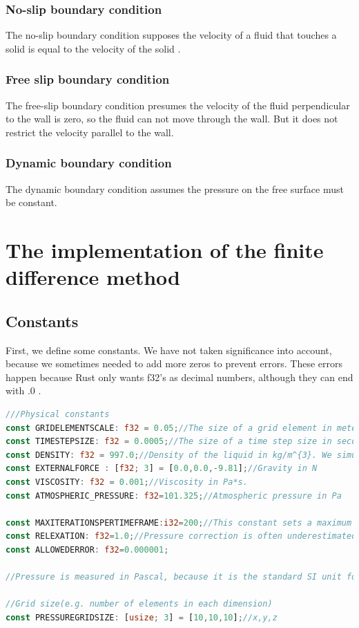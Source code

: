 \documentclass{article}
\begin{document}
\subsubsection{No-slip boundary condition} \label{no-slip boundary condition}
The no-slip boundary condition supposes the velocity of a fluid that touches a solid is equal to the velocity of the solid \cite{no-slip boundary condition}.
\subsubsection{Free slip boundary condition}
The free-slip boundary condition presumes the velocity of the fluid perpendicular to the wall is zero, so the fluid can not move through the wall. But it does not restrict the velocity parallel to the wall.\cite{free slip boundary condition} 
\subsubsection{Dynamic boundary condition}
The dynamic boundary condition assumes the pressure on the free surface must be constant.
\newpage
\section{The implementation of the finite difference method} \label{The implementation of the finite difference method}
\subsection{Constants} \label{Constants}
First, we define some constants. We have not taken significance into account, because we sometimes needed to add more zeros to prevent errors. These errors happen because Rust only wants f32's as decimal numbers, although they can end with .0 .
\begin{lstlisting}[language=Rust, style=boxed, breaklines=true]
///Physical constants
const GRIDELEMENTSCALE: f32 = 0.05;//The size of a grid element in meters(denoted in equations as delta x)
const TIMESTEPSIZE: f32 = 0.0005;//The size of a time step size in seconds
const DENSITY: f32 = 997.0;//Density of the liquid in kg/m^{3}. We simulate water.
const EXTERNALFORCE : [f32; 3] = [0.0,0.0,-9.81];//Gravity in N
const VISCOSITY: f32 = 0.001;//Viscosity in Pa*s.
const ATMOSPHERIC_PRESSURE: f32=101.325;//Atmospheric pressure in Pa

const MAXITERATIONSPERTIMEFRAME:i32=200;//This constant sets a maximum so the computer can not get in an infinite loop.
const RELEXATION: f32=1.0;//Pressure correction is often underestimated, this factor should be between 1.4 and 1.8.
const ALLOWEDERROR: f32=0.000001; 

//Pressure is measured in Pascal, because it is the standard SI unit for pressure.

//Grid size(e.g. number of elements in each dimension)
const PRESSUREGRIDSIZE: [usize; 3] = [10,10,10];//x,y,z
\end{lstlisting}
\newpage
\end{document}
